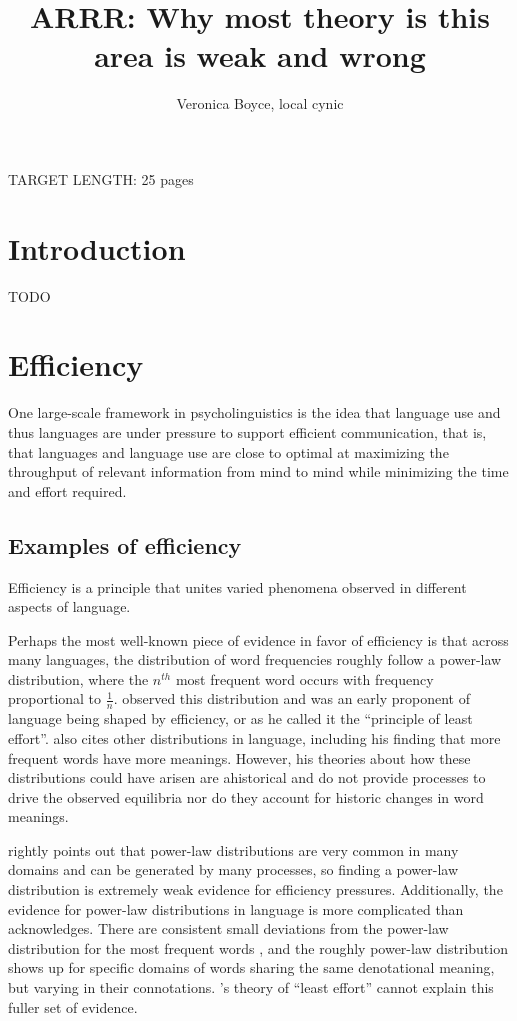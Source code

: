 \documentclass[]{article}
\title{ARRR: Why most theory is this area is weak and wrong}
\author{Veronica Boyce, local cynic}
\begin{document}
\maketitle



	


	
TARGET LENGTH: 25 pages
	

	
\section{Introduction}

TODO
	



\section{Efficiency}
One large-scale framework in psycholinguistics is the idea that language use and thus languages are under pressure to support efficient communication, that is, that languages and language use are close to optimal at maximizing the throughput of relevant information from mind to mind while minimizing the time and effort required. 

\subsection{Examples of efficiency}
Efficiency is a principle that unites varied phenomena observed in different aspects of language. 

Perhaps the most well-known piece of evidence in favor of efficiency is that across many languages, the distribution of word frequencies roughly follow a power-law distribution, where the $n^{th}$ most frequent word occurs with frequency proportional to $\frac{1}{n}$. \cite{zipf1949} observed this distribution and was an early proponent of language being shaped by efficiency, or as he called it the ``principle of least effort''. \cite{zipf1949} also cites other distributions in language, including his finding that more frequent words have more meanings. However, his theories about how these distributions could have arisen are ahistorical and do not provide processes to drive the observed equilibria nor do they account for historic changes in word meanings. 

\cite{piantadosi2014} rightly points out that power-law distributions are very common in many domains and can be generated by many processes, so finding a power-law distribution is extremely weak evidence for efficiency pressures. Additionally, the evidence for power-law distributions in language is more complicated than \cite{zipf1949} acknowledges. There are consistent small deviations from the power-law distribution for the most frequent words \cite{piantadosi2014}, and the roughly power-law distribution shows up for specific domains of words sharing the same denotational meaning, but varying in their connotations. \cite{zipf1949}'s theory of ``least effort'' cannot explain this fuller set of evidence. 
\end{document}
